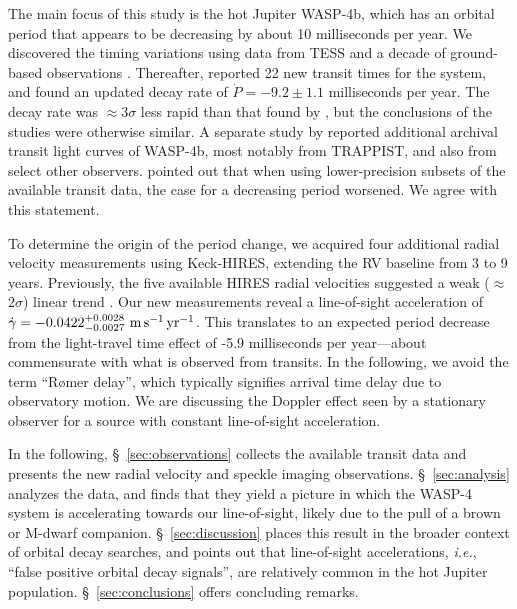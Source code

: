 \documentclass[12pt,twocolumn,tighten]{aastex62}
\begin{document}
The main focus of this study is the hot Jupiter WASP-4b, which has an
orbital period that appears to be decreasing by about 10 milliseconds
per year.  We discovered the timing variations using data from TESS
\citep{ricker_transiting_2015}
and a decade of ground-based observations \citep[][hereafter
]{bouma_wasp4b_2019}.  Thereafter,
\citet{southworth_transit_2019} reported 22 new transit times for the
system, and found an updated decay rate of $\dot{P} = -9.2 \pm 1.1$
milliseconds per year. The \citeauthor{southworth_transit_2019} decay
rate was $\approx$3$\sigma$ less rapid than that found by
, but the conclusions of the studies
were otherwise similar.  A separate study by \citet{baluev_2019}
reported additional archival transit light curves of WASP-4b, most
notably from TRAPPIST, and also from select other
observers.  \citet{baluev_2019} pointed out that when using
lower-precision subsets of the available transit data, the case for a
decreasing period worsened.  We agree with this statement.

To determine the origin of the period change, we acquired four
additional radial velocity measurements using Keck-HIRES, extending
the RV baseline from 3 to 9 years.  Previously, the five available
HIRES radial velocities suggested a weak ($\approx$$2\sigma$) linear trend
\citep{knutson_friends_2014}.  Our new measurements reveal a
line-of-sight acceleration of $\dot{\gamma} =
-0.0422^{+0.0028}_{-0.0027}\ {\rm m\,s^{-1}\,yr^{-1}}$.  This
translates to an expected period decrease from the light-travel time
effect of -5.9 milliseconds per year---about commensurate with what is
observed from transits.  In the following, we avoid the term
``R{\o}mer delay'', which typically signifies arrival time delay due
to observatory motion. We are discussing the Doppler effect seen by a
stationary observer for a source with constant line-of-sight
acceleration.

In the following, \S~\ref{sec:observations} collects the available
transit data and presents the new radial velocity and speckle imaging
observations.  \S~\ref{sec:analysis} analyzes the data, and finds that
they yield a picture in which the WASP-4 system is accelerating
towards our line-of-sight, likely due to the pull of a brown or
M-dwarf companion.  \S~\ref{sec:discussion} places this result in the
broader context of orbital decay searches, and points out that
line-of-sight accelerations, {\it i.e.}, ``false positive orbital
decay signals'', are relatively common in the hot Jupiter population.
\S~\ref{sec:conclusions} offers concluding remarks.
\end{document}
